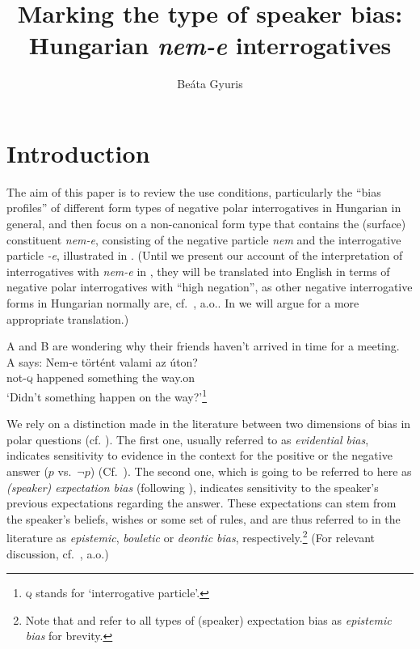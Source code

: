 \documentclass[output=paper,colorlinks,citecolor=brown]{langscibook}
\author{Beáta Gyuris\orcid{0000-0001-8804-7409}\affiliation{HUN-REN Hungarian Research Centre for Linguistics, Budapest and ELTE Eötvös Loránd University, Budapest}}
\title[Marking the type of speaker bias]{Marking the type of speaker bias: Hungarian \textit{nem-e} interrogatives}
\begin{document}
	\maketitle

\section{Introduction}\label{sect:intro}
	
	The aim of this paper is to review the use conditions, particularly the 
	``bias profiles'' of different form types of negative polar interrogatives in Hungarian in general, and then focus on a non-canonical form type that contains the (surface) constituent \textit{nem-e}, consisting  of the negative particle \textit{nem} and the interrogative particle \textit{-e}, illustrated in . (Until we present our account of the interpretation of interrogatives with \textit{nem-e} in , they  will be translated into English in terms of  negative polar interrogatives with ``high negation'', as other negative interrogative forms in Hungarian normally are, cf.~\citealt{Gyuris2017}, a.o.. In  we will argue for a more appropriate translation.) 
	
	\ea\label{ex:tortent}
	A and B are wondering why their friends haven't arrived in time for a meeting.\\
	A says:
	\gll Nem-e történt valami az úton?\\
	not-\textsc{q} happened something the way.on\\ 
	\glt `Didn't something happen on the way?'\footnote{\textsc{q} stands for `interrogative particle'. }
	\z
	
	
	We rely on a distinction made in the literature between two dimensions of bias in polar questions (cf. \citealt{sudo2013}). The first one, usually referred to as \textit{evidential bias}, indicates sensitivity to evidence in the context for the positive  or the negative answer ($p$ vs.~$\neg p$) (Cf.~\citealt{ladd81, buring+gunlogson, roelofsen-etal2013}). The second one, which is going to be referred to here as \textit{(speaker) expectation bias} (following \citealt{silk2020}), indicates sensitivity to the speaker's previous expectations regarding the answer. These expectations can stem from the speaker's beliefs, wishes or some set of rules, and are thus referred to in the literature as \textit{epistemic}, \textit{bouletic} or \textit{deontic bias}, respectively.\footnote{Note that \citet{sudo2013} and \citet{gaertner+gyuris17, Gartner2023} refer to all types of (speaker) expectation bias as \textit{epistemic bias} for brevity.} (For relevant discussion, cf.~\citealt{romero+han, Reese2007, reese+asher2009, domaneschietal, silk2020}, a.o.)
	
\end{document}
